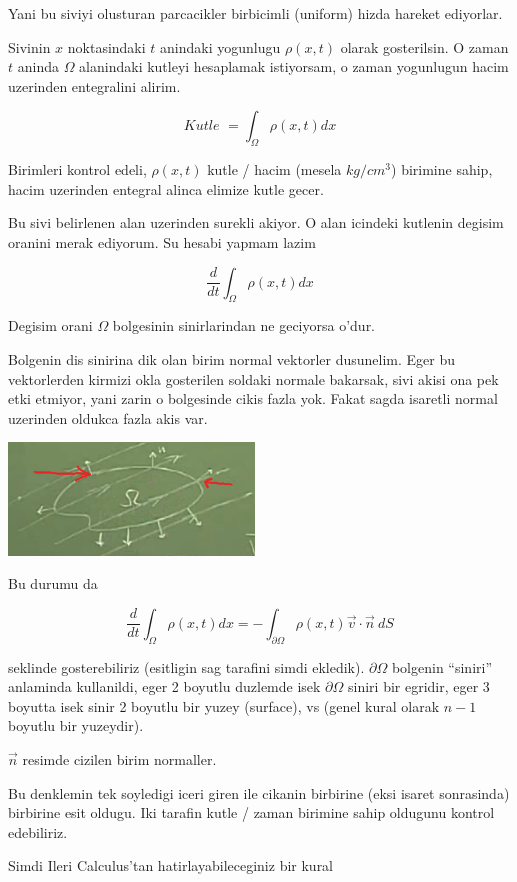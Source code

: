 \documentclass[12pt,fleqn]{article}
\begin{document}
Yani bu siviyi olusturan parcacikler birbicimli (uniform) hizda hareket
ediyorlar. 

Sivinin $x$ noktasindaki $t$ anindaki yogunlugu $\rho(x,t)$ olarak
gosterilsin. O zaman $t$ aninda $\Omega$ alanindaki kutleyi hesaplamak
istiyorsam, o zaman yogunlugun hacim uzerinden entegralini alirim. 

\[ \textit{Kutle } = \int_\Omega \rho(x,t) dx \]

Birimleri kontrol edeli, $\rho(x,t)$ kutle / hacim (mesela $kg / cm^3$)
birimine sahip, hacim uzerinden entegral alinca elimize kutle gecer. 

Bu sivi belirlenen alan uzerinden surekli akiyor. O alan icindeki kutlenin
degisim oranini merak ediyorum. Su hesabi yapmam lazim

\[ \frac{d}{dt} \int_\Omega \rho(x,t) dx   \]


Degisim orani $\Omega$ bolgesinin sinirlarindan ne geciyorsa o'dur. 

Bolgenin dis sinirina dik olan birim normal vektorler dusunelim. Eger bu
vektorlerden kirmizi okla gosterilen soldaki normale bakarsak, sivi akisi
ona pek etki etmiyor, yani zarin o bolgesinde cikis fazla yok. Fakat sagda
isaretli normal uzerinden oldukca fazla akis var.

\includegraphics[height=3cm]{1_2.png}

Bu durumu da

\[ \frac{d}{dt} \int_\Omega \rho(x,t) dx   = 
- \int_{\partial \Omega} \rho(x,t) \vec{v} \cdot \vec{n} \ dS 
\]

seklinde gosterebiliriz (esitligin sag tarafini simdi ekledik). $\partial
\Omega$ bolgenin 
``siniri'' anlaminda kullanildi, eger 2 boyutlu duzlemde isek
$\partial \Omega$ siniri bir egridir, eger 3 boyutta isek sinir 2 boyutlu bir
yuzey (surface), vs (genel kural olarak $n-1$ boyutlu bir yuzeydir).

$\vec{n}$ resimde cizilen birim normaller. 

Bu denklemin tek soyledigi iceri giren ile cikanin birbirine (eksi isaret
sonrasinda) birbirine esit oldugu. Iki tarafin kutle / zaman birimine sahip
oldugunu kontrol edebiliriz. 

Simdi Ileri Calculus'tan hatirlayabileceginiz bir kural 
\end{document}
